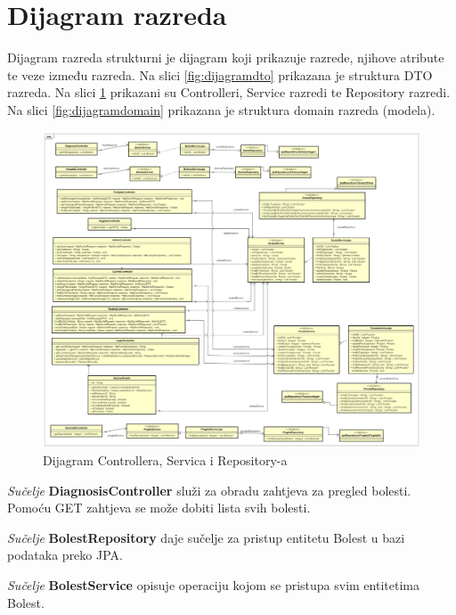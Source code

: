 			\eject
			
			
		\section{Dijagram razreda}
			
			Dijagram razreda strukturni je dijagram koji prikazuje razrede, njihove atribute te veze između razreda. Na slici \ref{fig:dijagramdto} prikazana je struktura DTO razreda. Na slici \ref{fig:dijagramcontroll} prikazani su Controlleri, Service razredi te Repository razredi. Na slici \ref{fig:dijagramdomain} prikazana je struktura domain razreda (modela). 
			
			
			\begin{figure}[H]
				\includegraphics[width=\textwidth]{dijagrami/Class Diagram3.png} %
				\caption{Dijagram Controllera, Servica i Repository-a}
				\label{fig:dijagramcontroll} %
			\end{figure}
			
			\textit{Sučelje }\textbf{DiagnosisController}
			služi za obradu zahtjeva za pregled bolesti. Pomoću GET zahtjeva se može dobiti lista svih bolesti.
			
			\textit{Sučelje }\textbf{BolestRepository}
			 daje sučelje za pristup entitetu Bolest u bazi podataka preko JPA.
			
			\textit{Sučelje }\textbf{BolestService}
			 opisuje operaciju kojom se pristupa svim entitetima Bolest.
			
